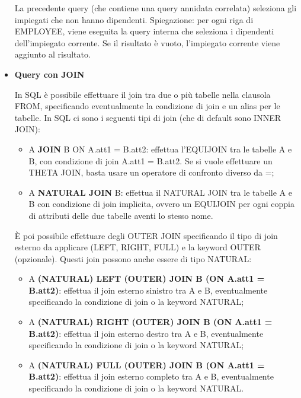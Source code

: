 \begin{itemize}
La precedente query (che contiene una query annidata correlata) seleziona gli impiegati che non hanno dipendenti. Spiegazione: per ogni riga di EMPLOYEE, viene eseguita la query interna che seleziona i dipendenti dell’impiegato corrente. Se il risultato è vuoto, l’impiegato corrente viene aggiunto al risultato. 


\item{\textbf{Query con JOIN}}

In SQL è possibile effettuare il join tra due o più tabelle nella clausola FROM, specificando eventualmente la condizione di join e un alias per le tabelle. In SQL ci sono i seguenti tipi di join (che di default sono INNER JOIN):

\begin{itemize}

\item{A \textbf{JOIN} B ON A.att1 = B.att2}: effettua l’EQUIJOIN tra le tabelle A e B, con condizione di join A.att1 = B.att2. Se si vuole effettuare un THETA JOIN, basta usare un operatore di confronto diverso da =;
\item{A \textbf{NATURAL JOIN} B}: effettua il NATURAL JOIN tra le tabelle A e B con condizione di join implicita, ovvero un EQUIJOIN per ogni coppia di attributi delle due tabelle aventi lo stesso nome.

\end{itemize}

È poi possibile effettuare degli OUTER JOIN specificando il tipo di join esterno da applicare (LEFT, RIGHT, FULL) e la keyword OUTER (opzionale). Questi join possono anche essere di tipo NATURAL:

\begin{itemize}

\item{A \textbf{(NATURAL) LEFT (OUTER) JOIN B (ON A.att1 = B.att2)}}: effettua il join esterno sinistro tra A e B, eventualmente specificando la condizione di join o la keyword NATURAL;
\item{A \textbf{(NATURAL) RIGHT (OUTER) JOIN B (ON A.att1 = B.att2)}}: effettua il join esterno destro tra A e B, eventualmente specificando la condizione di join o la keyword NATURAL;
\item{A \textbf{(NATURAL) FULL (OUTER) JOIN B (ON A.att1 = B.att2)}}: effettua il join esterno completo tra A e B, eventualmente specificando la condizione di join o la keyword NATURAL.  

\end{itemize}



\end{itemize}
